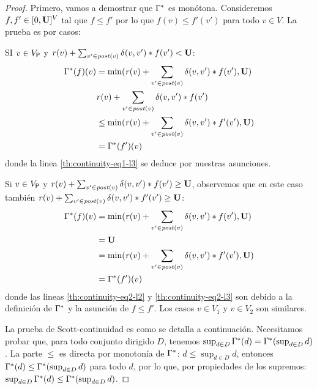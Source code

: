 \begin{proof}
    
    Primero, vamos a demostrar que $\Gamma^*$ es monótona. Consideremos $f,f' \in [0,\mathbf{U}]^V$  tal que
$f \leq f'$ por lo que $f(v) \leq f'(v')$ para todo $v \in V$.  La prueba es por casos:

    SI $v \in V_{\mathsf{P}}$ y $\mathit{r}(v) + \sum_{v' \in \mathit{post}(v)} \delta(v,v')* f(v') < \mathbf{U}$:
\begin{align}
    \Gamma^*(f)(v) & = \min (\mathit{r}(v) + \sum_{v' \in \mathit{post}(v)} \delta(v,v')* f(v'), \mathbf{U})\label{th:continuity-eq1-l1} \\
            & \mathit{r}(v) + \sum_{v' \in \mathit{post}(v)} \delta(v,v')* f(v') \label{th:continuity-eq1-l2} \\
           & \leq \min (\mathit{r}(v) + \sum_{v' \in \mathit{post}(v)} \delta(v,v') * f'(v'), \mathbf{U})          \label{th:continuity-eq1-l3} \\
           & = \Gamma^*(f')(v)  
\end{align}
    donde la linea \ref{th:continuity-eq1-l3} se deduce por nuestras asunciones.
   
    Si $v \in V_{\mathsf{P}}$ y $\mathit{r}(v) + \sum_{v' \in \mathit{post}(v)} \delta(v,v')* f(v') \geq \mathbf{U}$, observemos que en este caso también $\mathit{r}(v) + \sum_{v' \in \mathit{post}(v)} \delta(v,v')* f'(v') \geq \mathbf{U}$:
\begin{align}
    \Gamma^*(f)(v) & = \min(\mathit{r}(v) + \sum_{v' \in \mathit{post}(v)} \delta(v,v')* f(v'), \mathbf{U}) \label{th:continuity-eq2-l1} \\
                            & = \mathbf{U}                                                                  \label{th:continuity-eq2-l2} \\
                            & = \min( \mathit{r}(v) + \sum_{v' \in \mathit{post}(v)} \delta(v,v') * f'(v'), \mathbf{U}) \label{th:continuity-eq2-l3} \\
                            & = \Gamma^*(f')(v)   \label{th:continuity-eq2-l4}
\end{align}
donde las lineas \ref{th:continuity-eq2-l2} y  \ref{th:continuity-eq2-l3} son debido a la definición de $\Gamma^*$ y la asunción de $f \leq f'$.
    Los casos $v \in V_1$ y $v \in V_2$ son similares.
    
    La prueba de Scott-continuidad es como se detalla a continuación. Necesitamos probar que, para todo conjunto dirigido $D$, tenemos $\sup_{d \in D} \Gamma^*(d) =  \Gamma^*(\sup_{d \in D} d)$.
    La parte $\leq$ es directa por monotonía de $\Gamma^*$: $d \leq \sup_{d \in D} d$, entonces $\Gamma^*(d) \leq \Gamma^*( \sup_{d \in D} d)$ para todo $d$,
    por lo que, por propiedades de los supremos: $\sup_{d \in D} \Gamma^*(d) \leq  \Gamma^*(\sup_{d \in D} d)$.
    

\end{proof}
